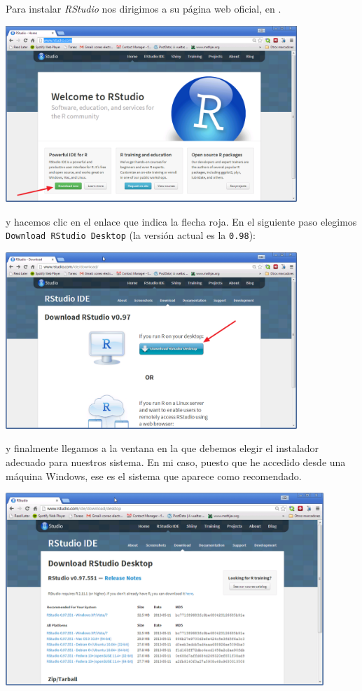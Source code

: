 \documentclass[10pt,a4paper]{article}\usepackage[]{graphicx}\usepackage[]{color}
\begin{document}
Para instalar {\em RStudio} nos dirigimos a su página web oficial, en
.
    \begin{center}
    \includegraphics[width=11cm]{../fig/Tut00-41.png}
    \end{center}
y hacemos clic en el enlace que indica la flecha roja. En el siguiente paso elegimos {\tt Download
RStudio Desktop} (la versión actual es la {\tt 0.98}):
    \begin{center}
    \includegraphics[width=11cm]{../fig/Tut00-42.png}
    \end{center}
y finalmente llegamos a la ventana en la que debemos elegir el instalador adecuado para nuestros
sistema.
En mi caso, puesto que he accedido desde una máquina Windows, ese es el sistema que aparece como
recomendado.
    \begin{center}
    \includegraphics[width=12cm]{../fig/Tut00-43.png}
    \end{center}
\end{document}

